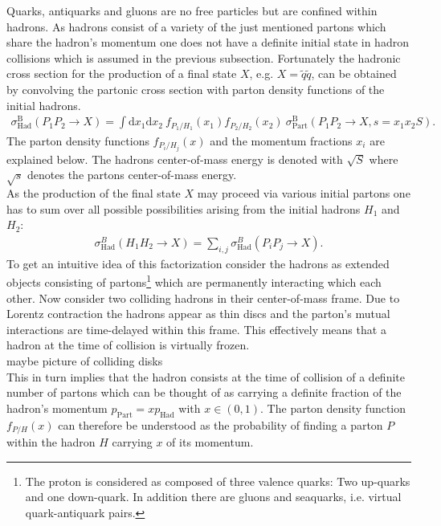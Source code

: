 Quarks, antiquarks and gluons are no free particles but are confined within hadrons. As hadrons consist of a variety of the just mentioned partons which share the hadron's momentum one does not have a definite initial state in hadron collisions which is assumed in the previous subsection. Fortunately the hadronic cross section for the production of a final state $X$, e.g. $X = \tilde{q} \tilde{q}$, can be obtained by convolving the partonic cross section with parton density functions of the initial hadrons.
\begin{align}
\sigma^\mathrm{B}_{\mathrm{Had}}(P_1 P_2 \to X) = \int \mbox{d}x_1 \mbox{d}x_2\ f_{P_1/H_1}(x_1) f_{P_2/H_2}(x_2)\ \sigma^\mathrm{B}_{\mathrm{Part}} (P_1 P_2 \to X, s = x_ 1x_2 S).
\end{align}
The parton density functions $f_{P_i/H_j}(x)$ and the momentum fractions $x_i$ are explained below. The hadrons center-of-mass energy is denoted with $\sqrt{S}$ where $\sqrt{s}$ denotes the partons center-of-mass energy.\\
As the production of the final state $X$ may proceed via various initial partons one has to sum over all possible possibilities arising from the initial hadrons $H_1$ and $H_2$:
\begin{align}
\sigma^B_{\mathrm{Had}}(H_1 H_2 \to X) = \sum_{i,j} \sigma^B_{\mathrm{Had}}(P_i P_j \to X).
\end{align}
To get an intuitive idea of this factorization consider the hadrons as extended objects consisting of partons\footnote{The proton is considered as composed of three valence quarks: Two up-quarks and one down-quark. In addition there are gluons and seaquarks, i.e. virtual quark-antiquark pairs.} which are permanently interacting which each other. Now consider two colliding hadrons in their center-of-mass frame. Due to Lorentz contraction the hadrons appear as thin discs and the parton's mutual interactions are time-delayed within this frame. This effectively means that a hadron at the time of collision is virtually frozen.\\
maybe picture of colliding disks\\
This in turn implies that the hadron consists at the time of collision of a definite number of partons which can be thought of as carrying a definite fraction of the hadron's  momentum $p_{\mathrm{Part}} = x p_{\mathrm{Had}}$ with $x \in \left(0, 1 \right)$. The parton density function $f_{P/H}(x)$ can therefore be understood as the probability of finding a parton $P$ within the hadron $H$ carrying $x$ of its momentum. 
